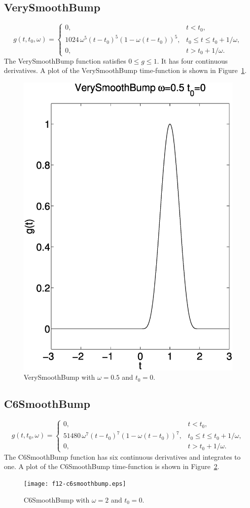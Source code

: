 \documentclass[11pt]{report}
\begin{document}
\subsection{VerySmoothBump} 
\[
g(t,t_0,\omega) = \left\{ 
\begin{array}{ll} 
0, & t < t_0,\\ 
1024\,\omega^5(t-t_0)^5 (1 - \omega(t-t_0))^5,& t_0 \leq t \leq t_0+1/\omega,\\ 
0, & t > t_0 + 1/\omega.
\end{array}
\right.
\]
The VerySmoothBump function satisfies $0\leq g\leq 1$. It has four continuous derivatives.
A plot of the VerySmoothBump time-function is shown in Figure~\ref{fig:verysmoothbump}.
\begin{figure}
\begin{centering}
  \includegraphics[width=0.4\linewidth]{f11-verysmoothbump.ps}
  \caption{VerySmoothBump with $\omega=0.5$ and $t_0=0$.}
  \label{fig:verysmoothbump}
\end{centering}
\end{figure}  
%
\subsection{C6SmoothBump} 
\[
g(t,t_0,\omega) = \left\{ 
\begin{array}{ll} 
0, & t < t_0,\\ 
51480\, \omega^7 (t-t_0)^7 (1- \omega(t-t_0))^7, & t_0 \leq t \leq t_0 + 1/\omega,\\ 
0, & t > t_0 + 1/\omega.
\end{array}
\right.
\]
The C6SmoothBump function has six continuous derivatives and integrates to one.
A plot of the C6SmoothBump time-function is shown in Figure~\ref{fig:c6smoothbump}.
\begin{figure}
\begin{centering}
  \texttt{[image: f12-c6smoothbump.eps]}
  \caption{C6SmoothBump with $\omega=2$ and $t_0=0$.}
  \label{fig:c6smoothbump}
\end{centering}
\end{figure}  
%
\end{document}
